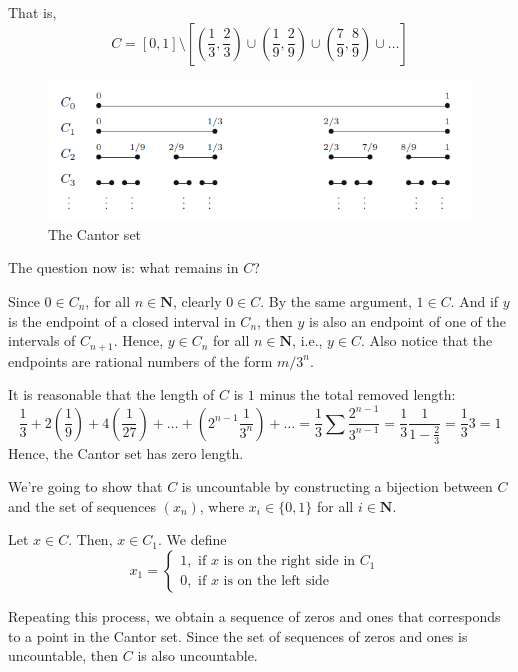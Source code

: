 \documentclass[12pt,a4paper]{article}
\theoremstyle{definition}
\begin{document}
That is,
\[
	C = [0,1] \setminus \left[ \left( \frac{1}{3}, \frac{2}{3} \right) \cup \left( \frac{1}{9}, \frac{2}{9} \right) \cup \left( \frac{7}{9}, \frac{8}{9} \right) \cup \ldots \right]
\]

\begin{figure}[h]
  \centering
  \includegraphics[width=\textwidth]{cantor-set}
  \caption{The Cantor set \cite{abbott2001understanding}}
  \label{fig:sup-inf}
\end{figure}

The question now is: what remains in $C$? 

Since $0 \in C_n$, for all $n \in \textbf{N}$, clearly $0 \in C$. By the same argument, $1 \in C$. And if $y$ is the endpoint of a closed interval in $C_n$, then $y$ is also an endpoint of one of the intervals of $C_{n+1}$. Hence, $y \in C_n$ for all $n \in \textbf{N}$, i.e., $y \in C$. Also notice that the endpoints are rational numbers of the form $m/3^n$.

It is reasonable that the length of $C$ is $1$ minus the total removed length:
\[
	\frac{1}{3} + 2 \left( \frac{1}{9} \right) + 4 \left( \frac{1}{27} \right) + \ldots + \left( 2^{n-1} \frac{1}{3^n} \right) + \ldots = \frac{1}{3} \sum \frac{2^{n-1}}{3^{n-1}} = \frac{1}{3} \frac{1}{1-\frac{2}{3}} = \frac{1}{3} 3 = 1
\]
Hence, the Cantor set has zero length.

We're going to show that $C$ is uncountable by constructing a bijection between $C$ and the set of sequences $(x_n)$, where $x_i \in \{0,1\}$ for all $i \in \textbf{N}$.

Let $x \in C$. Then, $x \in C_1$. We define
\begin{equation*}
  x_1 = \begin{cases}
      1, \text{ if $x$ is on the right side in $C_1$ } \\
  	  0, \text{ if $x$ is on the left side }
  \end{cases}
\end{equation*}

Repeating this process, we obtain a sequence of zeros and ones that corresponds to a point in the Cantor set. Since the set of sequences of zeros and ones is uncountable, then $C$ is also uncountable.
\end{document}
